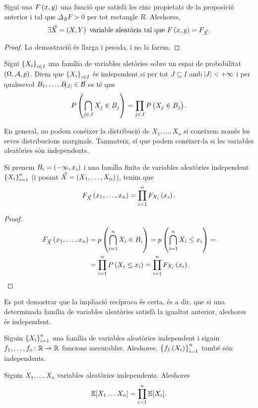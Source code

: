 \begin{prop}
    Sigui una $F\left( x,y\right)$ una funció que satisfà les cinc propietats de la proposició anterior i tal que $\Delta_RF>0$ per tot rectangle $R$. Aleshores,
    \[
        \exists \vec{X}=\left( X,Y\right) \text{ variable aleatòria tal que } F\left( x,y\right) = F_{\vec{X}}.
    \]
\end{prop}
\begin{proof}
    La demostració és llarga i pesada, i no la farem.
\end{proof}
\begin{defi}
    Sigui $\left\{ X_i\right\}_{i\in I}$ una família de variables aletòries sobre un espai de probabilitat $\left(\Omega,\mathcal{A},p\right)$. Diem que $\left\{ X_i\right\}_{i\in I}$ és independent si per tot $J\subseteq I$ amb $\abs{J}<+\infty$ i per qualssevol $B_1,\dots,B_{\abs{J}}\in\mathcal{B}$ es té que
    \[
        P\left(\bigcap_{j\in J}X_j\in B_j\right) = \prod_{j\in J} P\left( X_j\in B_j\right).
    \]
\end{defi}
En general, no podem conéixer la distribució de $X_1,\dots,X_n$ si coneixem només les seves distribucions marginals. Tanmateix, sí que podem conéixer-la si les variables aleatòries són independents.
\begin{prop}
    Si prenem $B_i=\left(-\infty,x_i\right)$ i una família finita de variables aleatòries independent $\left\{ X_i\right\}_{i=1}^n$ (i posant $\vec{X}=\left( X_1,\dots,X_n\right)$), tenim que
    \[
        F_{\vec{X}}\left( x_1,\dots,x_n\right) = \prod_{i=1}^n F_{X_i}\left( x_i\right).
    \]
\end{prop}
\begin{proof}
    \begin{align*}
        F_{\vec{X}}\left( x_1,\dots,x_n\right) &= p\left( \bigcap_{i=1}^n X_i\in B_i\right) =p\left( \bigcap_{i=1}^n X_i\leq x_i\right) =\\
        &= \prod_{i=1}^n P\left( X_i\leq x_i\right) = \prod_{i=1}^n F_{X_i}\left( x_i\right).
    \end{align*}
\end{proof}
\begin{obs}
    Es pot demostrar que la impliació recíproca és certa, és a dir, que si una determinada família de variables aleatòries satisfà la igualtat anterior, aleshores és independent.
\end{obs}
\begin{obs}
    Siguin $\left\{ X_i\right\}_{i=1}^n$ una família de variables aleatòries independent i siguin $f_1,\dots,f_n\colon \mathbb{R}\to\mathbb{R}$ funcions mesurables. Aleshores, $\left\{ f_1\left( X_i\right)\right\}_{i=1}^n$ també són independents.
\end{obs}
\begin{prop}
    Siguin $X_1, \dots, X_n$ variables aleatòries independents. Aleshores 
    \[
        \operatorname{\mathbb{E}}[X_1\dots X_n] = \prod \limits_{i=1}^n \operatorname{\mathbb{E}}[X_i].
    \]
\end{prop}

